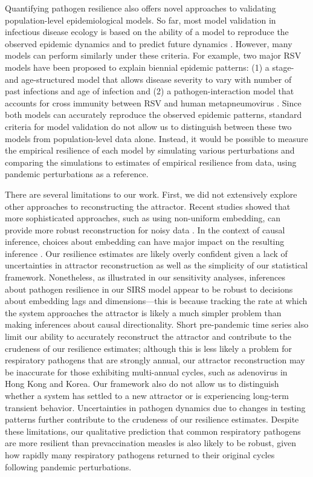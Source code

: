 \documentclass[12pt]{article}
\begin{document}
Quantifying pathogen resilience also offers novel approaches to validating population-level epidemiological models.
So far, most model validation in infectious disease ecology is based on the ability of a model to reproduce the observed epidemic dynamics and to predict future dynamics \citep{grenfell2002dynamics,bhattacharyya2015cross,pitzer2015environmental,dean2018human,pons2018serotype}.
However, many models can perform similarly under these criteria.
For example, two major RSV models have been proposed to explain biennial epidemic patterns: (1) a stage- and age-structured model that allows disease severity to vary with number of past infections and age of infection \citep{pitzer2015environmental} and (2) a pathogen-interaction model that accounts for cross immunity between RSV and human metapneumovirus \citep{bhattacharyya2015cross}.
Since both models can accurately reproduce the observed epidemic patterns, standard criteria for model validation do not allow us to distinguish between these two models from population-level data alone.
Instead, it would be possible to measure the empirical resilience of each model by simulating various perturbations and comparing the simulations to estimates of empirical resilience from data, using pandemic perturbations as a reference.

There are several limitations to our work.
First, we did not extensively explore other approaches to reconstructing the attractor.
Recent studies showed that more sophisticated approaches, such as using non-uniform embedding, can provide more robust reconstruction for noisy data \citep{tan2023selecting}.
In the context of causal inference, choices about embedding can have major impact on the resulting inference \citep{cobey2016limits}.
Our resilience estimates are likely overly confident given a lack of uncertainties in attractor reconstruction as well as the simplicity of our statistical framework.
Nonetheless, as illustrated in our sensitivity analyses, inferences about pathogen resilience in our SIRS model appear to be robust to decisions about embedding lags and dimensions---this is because tracking the rate at which the system approaches the attractor is likely a much simpler problem than making inferences about causal directionality.
Short pre-pandemic time series also limit our ability to accurately reconstruct the attractor and contribute to the crudeness of our resilience estimates;
although this is less likely a problem for respiratory pathogens that are strongly annual, our attractor reconstruction may be inaccurate for those exhibiting multi-annual cycles, such as adenovirus in Hong Kong and Korea.
Our framework also do not allow us to distinguish whether a system has settled to a new attractor or is experiencing long-term transient behavior.
Uncertainties in pathogen dynamics due to changes in testing patterns further contribute to the crudeness of our resilience estimates.
Despite these limitations, our qualitative prediction that common respiratory pathogens are more resilient than prevaccination measles is also likely to be robust, given how rapidly many respiratory pathogens returned to their original cycles following pandemic perturbations.
\end{document}
